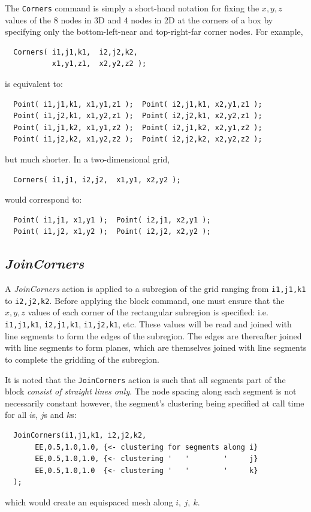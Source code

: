 \documentclass{warpdoc}
\begin{document}
The \verb|Corners| command is simply a short-hand notation
for fixing the $x,y,z$ values of the 8 nodes in 3D and 4 nodes
in 2D at the corners of a box
by specifying only the bottom-left-near and top-right-far corner nodes.
For example,
%
\begin{verbatim}
  Corners( i1,j1,k1,  i2,j2,k2,  
           x1,y1,z1,  x2,y2,z2 );
\end{verbatim}
%
is equivalent to:
%
\begin{verbatim}
  Point( i1,j1,k1, x1,y1,z1 );  Point( i2,j1,k1, x2,y1,z1 );
  Point( i1,j2,k1, x1,y2,z1 );  Point( i2,j2,k1, x2,y2,z1 );
  Point( i1,j1,k2, x1,y1,z2 );  Point( i2,j1,k2, x2,y1,z2 );
  Point( i1,j2,k2, x1,y2,z2 );  Point( i2,j2,k2, x2,y2,z2 );
\end{verbatim}
%
but much shorter. In a two-dimensional grid,
%
\begin{verbatim}
  Corners( i1,j1, i2,j2,  x1,y1, x2,y2 );
\end{verbatim}
%
would correspond to:
%
\begin{verbatim}
  Point( i1,j1, x1,y1 );  Point( i2,j1, x2,y1 );
  Point( i1,j2, x1,y2 );  Point( i2,j2, x2,y2 );
\end{verbatim}
%

\subsection{\emph{JoinCorners}}

A \emph{JoinCorners} action is applied to a
subregion of the grid 
ranging from \verb|i1,j1,k1| to \verb|i2,j2,k2|. Before applying
the block command, one must ensure that the $x,y,z$ values of each corner
of the rectangular subregion is specified: i.e. \verb|i1,j1,k1|,
\verb|i2,j1,k1|, \verb|i1,j2,k1|, etc. These values will
be read and joined with line segments to form the edges of
the subregion. The edges are thereafter joined with line segments 
to form planes, which are themselves joined with line segments to complete
the gridding of the subregion.

It is noted that the \verb|JoinCorners|
action is such that all segments part of the block \emph{consist
of straight lines only}. The node spacing along each segment
is not necessarily constant however, the segment's clustering
being specified at call time for all $i$s, $j$s and $k$s:
%
\begin{verbatim}
  JoinCorners(i1,j1,k1, i2,j2,k2,
       EE,0.5,1.0,1.0, {<- clustering for segments along i}
       EE,0.5,1.0,1.0, {<- clustering '   '        '     j}
       EE,0.5,1.0,1.0  {<- clustering '   '        '     k}
  );
\end{verbatim}
%
which would create an equispaced mesh along $i,~j,~k$. 
\end{document}
